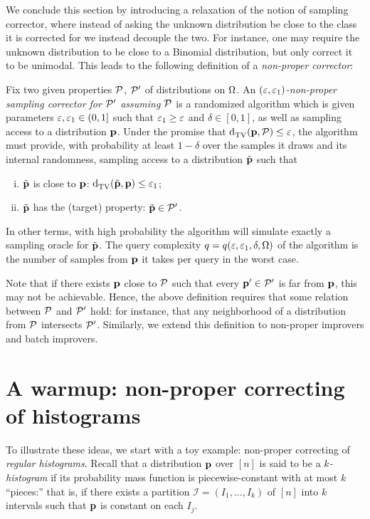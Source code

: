 We conclude this section by introducing a relaxation of the notion of sampling corrector, where instead of asking the unknown distribution be close to the class it is corrected for we instead decouple the two. For instance, one may require the unknown distribution to be close to a Binomial distribution, but only correct it to be unimodal. This leads to the following definition of a \emph{non-proper corrector}:
\begin{definition}\label{def:sampling:corrector:np}
  Fix two given properties $\mathcal{P}$, $\mathcal{P}^\prime$ of distributions on ${\Omega}$. 
An \emph{$(\varepsilon,\varepsilon_1)$-non-proper sampling corrector for $\mathcal{P}^\prime$ assuming $\mathcal{P}$} is a randomized algorithm which is given parameters $\varepsilon, \varepsilon_1\in(0,1]$ such that $\varepsilon_1 \geq \varepsilon$ and $\delta\in[0,1]$, as well as sampling access to a distribution $\mathbf{p}$. Under the promise that ${\operatorname{d}_{\textrm{TV}}^{}\!\left({\mathbf{p}, \mathcal{P}}\right)}\leq \varepsilon$, the algorithm must provide, with probability at least $1-\delta$ over the samples it draws and its internal randomness, sampling access to a distribution $\tilde{\mathbf{p}}$ such that
  \begin{enumerate}[(i)]
    \item $\tilde{\mathbf{p}}$ is close to $\mathbf{p}$: ${\operatorname{d}_{\textrm{TV}}^{}\!\left({\tilde{\mathbf{p}}, \mathbf{p}}\right)} \leq \varepsilon_1$;
    \item $\tilde{\mathbf{p}}$ has the (target) property: $\tilde{\mathbf{p}}\in \mathcal{P}^\prime$.
  \end{enumerate}
  In other terms, with high probability the {algorithm}  will simulate exactly a sampling oracle for $\tilde{\mathbf{p}}$. The query complexity $q=q(\varepsilon,\varepsilon_1,\delta,{\Omega})$ of the algorithm is the number of samples from $\mathbf{p}$ it takes per query in the worst case.
\end{definition}
{Note that if there exists $\mathbf{p}$ close to $\mathcal{P}$ such that every $\mathbf{p}^\prime\in\mathcal{P}^\prime$ is far from $\mathbf{p}$, this may not be achievable. Hence, the above definition requires that some relation between $\mathcal{P}$ and $\mathcal{P}^\prime$ hold: for instance, that any neighborhood of a distribution from $\mathcal{P}$ intersects $\mathcal{P}^\prime$.} Similarly, we extend this definition to non-proper improvers and batch improvers.
\section{A warmup: non-proper correcting of histograms}\label{sec:focus:samples:hist}
	To illustrate these ideas, we start with a toy example: non-proper correcting of \emph{regular histograms}. Recall that a distribution $\mathbf{p}$ over $[n]$ is said to be a \emph{$k$-histogram} if its probability mass function is piecewise-constant with at most $k$ ``pieces:'' that is, if there exists a partition $\mathcal{I}=(I_1,\dots,I_k)$ of $[n]$ into $k$ intervals such that $\mathbf{p}$ is constant on each $I_j$.

